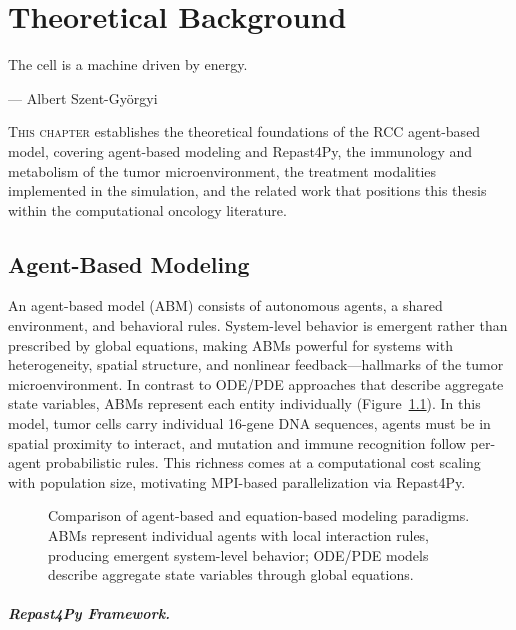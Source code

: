 \chapter{Theoretical Background}
\label{ch:theoretical_background}

\epigraph{The cell is a machine driven by energy.}{--- Albert Szent-Gy\"{o}rgyi}

\lettrine[lines=2]{T}{his chapter} establishes the theoretical foundations of the RCC agent-based model, covering agent-based modeling and Repast4Py, the immunology and metabolism of the tumor microenvironment, the treatment modalities implemented in the simulation, and the related work that positions this thesis within the computational oncology literature.

\section{Agent-Based Modeling}
\label{sec:bg_abm}

An agent-based model (ABM) consists of autonomous agents, a shared environment, and behavioral rules.  System-level behavior is emergent rather than prescribed by global equations, making ABMs powerful for systems with heterogeneity, spatial structure, and nonlinear feedback---hallmarks of the tumor microenvironment.  In contrast to ODE/PDE approaches that describe aggregate state variables, ABMs represent each entity individually (Figure~\ref{fig:abm_vs_ode}).  In this model, tumor cells carry individual 16-gene DNA sequences, agents must be in spatial proximity to interact, and mutation and immune recognition follow per-agent probabilistic rules.  This richness comes at a computational cost scaling with population size, motivating MPI-based parallelization via Repast4Py.

\begin{figure}[htbp]
\centering
{}
\caption{Comparison of agent-based and equation-based modeling paradigms. ABMs represent individual agents with local interaction rules, producing emergent system-level behavior; ODE/PDE models describe aggregate state variables through global equations.}
\label{fig:abm_vs_ode}
\end{figure}

\paragraph{Repast4Py Framework.}
\label{subsec:repast4py}

